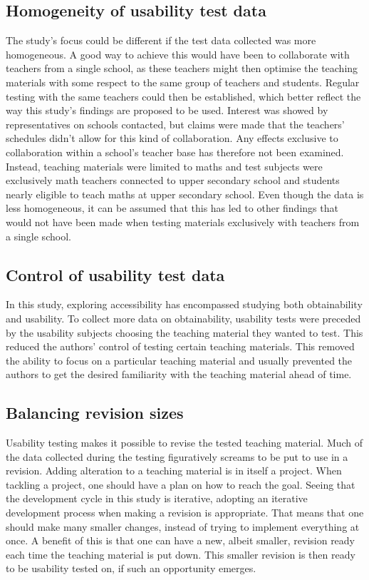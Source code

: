 \subsection{Homogeneity of usability test data}
The study's focus could be different if the test data collected was more homogeneous. A good way to achieve this would have been to collaborate with teachers from a single school, as these teachers might then optimise the teaching materials with some respect to the same group of teachers and students. Regular testing with the same teachers could then be established, which better reflect the way this study's findings are proposed to be used. Interest was showed by representatives on schools contacted, but claims were made that the teachers' schedules didn't allow for this kind of collaboration. 
Any effects exclusive to collaboration within a school's teacher base has therefore not been examined. Instead, teaching materials were limited to maths and test subjects were exclusively math teachers connected to upper secondary school and students nearly eligible to teach maths at upper secondary school. Even though the data is less homogeneous, it can be assumed that this has led to other findings that would not have been made when testing materials exclusively with teachers from a single school.

\subsection{Control of usability test data}
In this study, exploring accessibility has encompassed studying both obtainability and usability. To collect more data on obtainability, usability tests were preceded by the usability subjects choosing the teaching material they wanted to test. This reduced the authors' control of testing certain teaching materials. 
This removed the ability to focus on a particular teaching material and usually prevented the authors to get the desired familiarity with the teaching material ahead of time.

\subsection{Balancing revision sizes}
Usability testing makes it possible to revise the tested teaching material. Much of the data collected during the testing figuratively screams to be put to use in a revision. Adding alteration to a teaching material is in itself a project. When tackling a project, one should have a plan on how to reach the goal. Seeing that the development cycle in this study is iterative, adopting an iterative development process when making a revision is appropriate. 
That means that one should make many smaller changes, instead of trying to implement everything at once. A benefit of this is that one can have a new, albeit smaller, revision ready each time the teaching material is put down. This smaller revision is then ready to be usability tested on, if such an opportunity emerges. 

